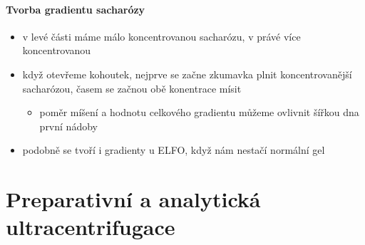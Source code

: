 \documentclass[DIV=8]{scrreprt}
\begin{document}
\paragraph{Tvorba gradientu sacharózy}
\begin{itemize}[nosep]
    \item v levé části máme málo koncentrovanou sacharózu, v právé více koncentrovanou
    \item když otevřeme kohoutek, nejprve se začne zkumavka plnit koncentrovanější sacharózou, časem se začnou obě konentrace mísit
\begin{itemize}[nosep]
    \item poměr míšení a hodnotu celkového gradientu můžeme ovlivnit šířkou dna první nádoby
\end{itemize}

    \item podobně se tvoří i gradienty u ELFO, když nám nestačí normální gel
\end{itemize}



\section{Preparativní a analytická ultracentrifugace} \label{Preparativní a analytická ultracentrifugace}
\end{document}
